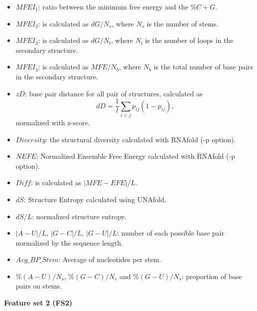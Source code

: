 \documentclass[]{scrartcl}
\begin{document}
\begin{itemize}
	\item $MFEI_1$: ratio between the minimum free energy and the $\%C + G$.
	\item $MFEI_2$: is calculated as $dG/N_{s}$, where $N_{s}$ is the number of stems.
	\item $MFEI_3$: is calculated as $dG/N_{l}$, where $N_{l}$ is the number of loops in the secondary structure.
	\item $MFEI_4$: is calculated as $MFE/N_{b}$, where $N_{b}$ is the total number of base pairs in the secondary structure.
	\item $zD$: base pair distance for all pair of structures, calculated as $$dD = \frac{1}{l} \sum_{i<j} p_{ij} (1 - p_{ij}) , $$ normalized with z-score.
	\item $Diversity$: the structural diversity calculated with RNAfold (-p option).
	\item $NEFE$: Normalized Ensemble Free Energy calculated with RNAfold (-p option).
	\item $Diff$: is calculated as $|MFE-EFE|/L$.
	\item $dS$: Structure Entropy calculated using UNAfold.
	\item $dS/L$: normalized structure entropy.
	\item $|A-U|/L$, $|G-C|/L$, $|G-U|/L$: number of each possible base pair normalized by the sequence length.
	\item $Avg\_BP\_Stem$: Average of nucleotides per stem.
	\item $\%(A-U)/N_{s}$, $\%(G-C)/N_{s}$ and $\%(G-U)/N_{s}$: proportion of base pairs on stems.
\end{itemize}

\vspace{20pt}

{\Large \textbf{Feature set 2 (FS2)}}
\vspace{2pt}
\end{document}
